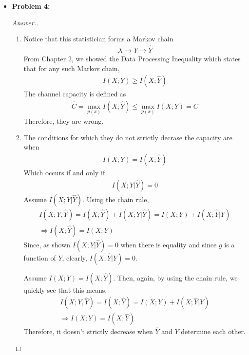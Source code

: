 \documentclass[10pt,twoside]{article}
\begin{document}
\begin{itemize}
    \item\textbf{Problem 4:} \newline
    \noindent\makebox[\linewidth]{\rule{18cm}{0.4pt}}
    \begin{proof}[Answer.]
    \begin{enumerate}
        \item 
    Notice that this statistician forms a Markov chain
    \begin{gather*}
        X \to Y \to \hat Y
    \end{gather*}
    From Chapter $2$, we showed the Data Processing Inequality which states that for any such Markov chain,
    \begin{gather*}
        I(X;Y)\geq I(X;\hat Y)
    \end{gather*}
     The channel capacity is defined as
    \begin{gather*}
        \hat C = \max_{p(x)} I(X;\hat Y) \leq \max_{p(x)}I(X;Y) = C
    \end{gather*}
    Therefore, they are wrong.
    \item The conditions for which they do not strictly decrase the capacity are when 
    \begin{gather*}
        I(X;Y) = I(X;\hat Y)
    \end{gather*}
    Which occurs if and only if 
    \begin{gather*}
        I(X;Y|\hat Y) = 0
    \end{gather*}
    Assume $I(X;Y|\hat Y)$. Using the chain rule,
    \begin{gather*}
        I(X;Y, \hat Y) = I(X;\hat Y) +  I(X;Y|\hat Y) = I(X;Y) + I(X;\hat Y|Y) \\
        \Rightarrow I(X;\hat Y) = I(X;Y)
    \end{gather*}
    Since, as shown $I(X;Y|\hat Y) = 0$ when there is equality and since $g$ is a function of $Y$, clearly, $I(X;\hat Y|Y) = 0$.
    
    Assume $I(X;Y) = I(X;\hat Y)$. Then, again, by using the chain rule, we quickly see that this means,
    \begin{gather*}
        I(X;Y,\hat Y) = I(X;\hat Y) = I(X;Y) + I(X;\hat Y|Y)
        \\
        \Rightarrow I(X;Y) = I(X;\hat Y)
    \end{gather*}
    Therefore, it doesn't strictly decrease when $\hat Y$ and $Y$ determine each other.
    
    \end{enumerate}
    \end{proof}
\end{itemize}

\label{LastPage}
\end{document}
